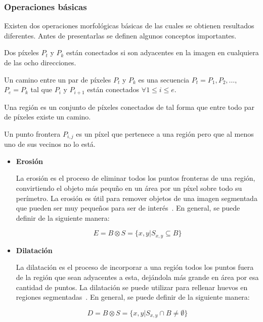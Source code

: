 \subsubsection{Operaciones básicas}

Existen dos operaciones morfológicas básicas de las cuales se obtienen resultados diferentes. Antes de presentarlas se definen algunos conceptos importantes.

\begin{definition}
	Dos píxeles $P_t$ y $P_k$ están conectados si son adyacentes en la imagen en cualquiera de las ocho direcciones.
\end{definition}

\begin{definition}
	Un camino entre un par de píxeles $P_t$ y $P_k$ es una secuencia $P_t = P_1, P_2, \ldots,$ $P_e = P_k$ tal que $P_i$ y $P_{i + 1}$ están conectados $\forall 1 \leq i \leq e$.
\end{definition}

\begin{definition}
	Una región es un conjunto de píxeles conectados de tal forma que entre todo par de píxeles existe un camino.
\end{definition}

\begin{definition}
	Un punto frontera $P_{i, j}$ es un píxel que pertenece a una región pero que al menos uno de sus vecinos no lo está.
\end{definition}

\begin{itemize}
	\item \textbf{Erosión}
	
	La erosión es el proceso de eliminar todos los puntos fronteras de una región, convirtiendo el objeto más pequño en un área por un píxel sobre todo su perímetro. La erosión es útil para remover objetos de una imagen segmentada que pueden ser muy pequeños para ser de interés~\cite{}. En general, se puede definir de la siguiente manera:
	
	\begin{equation}
		E = B \otimes S = \{x, y | S_{x, y} \subseteq B\}
	\end{equation}

	\item \textbf{Dilatación}
	
	La dilatación es el proceso de incorporar a una región todos los puntos fuera de la región que sean adyacentes a esta, dejándola más grande en área por esa cantidad de puntos. La dilatación se puede utilizar para rellenar huevos en regiones segmentadas~\cite{}. En general, se puede definir de la siguiente manera:
	
	\begin{equation}
		D = B \otimes S = \{x, y | S_{x, y} \cap B \neq \emptyset\}
	\end{equation}
\end{itemize}

